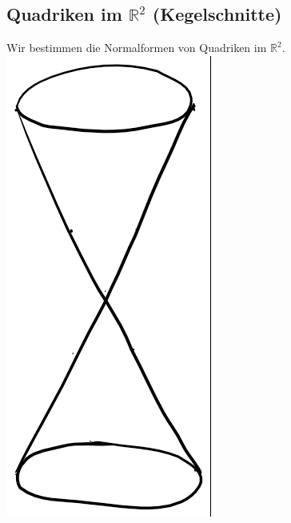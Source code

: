 \documentclass{scrbook}
\begin{document}
\subsection*{Quadriken im $\mathbb{R}^2$ (Kegelschnitte)}
Wir bestimmen die Normalformen von Quadriken im $\mathbb{R}^2$.
\\
\includegraphics{kegel.png}
\\
\end{document}
